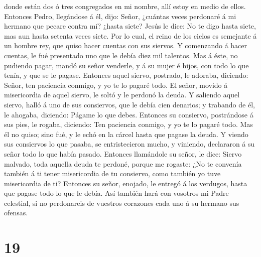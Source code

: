 donde están dos ó tres congregados en mi nombre, allí estoy en medio de
ellos.  Entonces Pedro, llegándose á él, dijo: Señor,
¿cuántas veces perdonaré á mi hermano que pecare contra mí? ¿hasta
siete?  Jesús le dice: No te digo hasta siete, mas aun
hasta setenta veces siete.  Por lo cual, el reino de los
cielos es semejante á un hombre rey, que quiso hacer cuentas con sus
siervos.  Y comenzando á hacer cuentas, le fué presentado
uno que le debía diez mil talentos.  Mas á éste, no
pudiendo pagar, mandó su señor venderle, y á su mujer é hijos, con todo
lo que tenía, y que se le pagase.  Entonces aquel siervo,
postrado, le adoraba, diciendo: Señor, ten paciencia conmigo, y yo te lo
pagaré todo.  El señor, movido á misericordia de aquel
siervo, le soltó y le perdonó la deuda.  Y saliendo aquel
siervo, halló á uno de sus consiervos, que le debía cien denarios; y
trabando de él, le ahogaba, diciendo: Págame lo que debes. 
Entonces su consiervo, postrándose á sus pies, le rogaba, diciendo: Ten
paciencia conmigo, y yo te lo pagaré todo.  Mas él no
quiso; sino fué, y le echó en la cárcel hasta que pagase la deuda.
 Y viendo sus consiervos lo que pasaba, se entristecieron
mucho, y viniendo, declararon á su señor todo lo que había pasado.
 Entonces llamándole su señor, le dice: Siervo malvado,
toda aquella deuda te perdoné, porque me rogaste:  ¿No te
convenía también á ti tener misericordia de tu consiervo, como también
yo tuve misericordia de ti?  Entonces su señor, enojado, le
entregó á los verdugos, hasta que pagase todo lo que le debía.
 Así también hará con vosotros mi Padre celestial, si no
perdonareis de vuestros corazones cada uno á su hermano sus ofensas.

\hypertarget{section-18}{%
\section{19}\label{section-18}}

